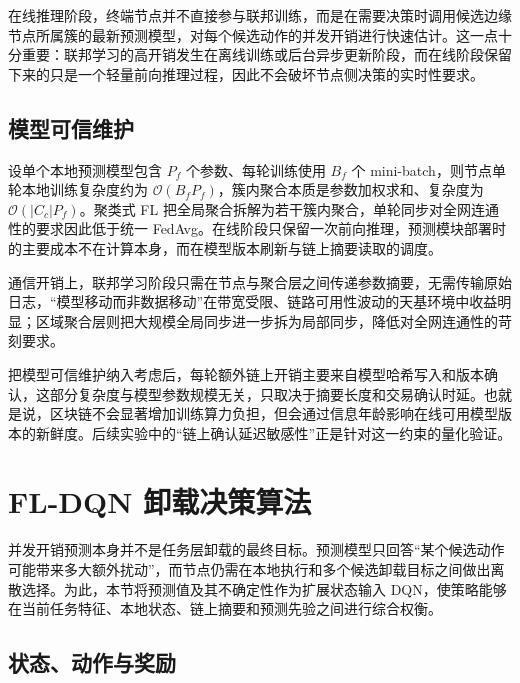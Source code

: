 在线推理阶段，终端节点并不直接参与联邦训练，而是在需要决策时调用候选边缘节点所属簇的最新预测模型，对每个候选动作的并发开销进行快速估计。这一点十分重要：联邦学习的高开销发生在离线训练或后台异步更新阶段，而在线阶段保留下来的只是一个轻量前向推理过程，因此不会破坏节点侧决策的实时性要求。

\subsection{模型可信维护}

设单个本地预测模型包含 $P_f$ 个参数、每轮训练使用 $B_f$ 个 mini-batch，则节点单轮本地训练复杂度约为 $\mathcal{O}(B_f P_f)$，簇内聚合本质是参数加权求和、复杂度为 $\mathcal{O}(|C_c|P_f)$。聚类式 FL 把全局聚合拆解为若干簇内聚合，单轮同步对全网连通性的要求因此低于统一 FedAvg。在线阶段只保留一次前向推理，预测模块部署时的主要成本不在计算本身，而在模型版本刷新与链上摘要读取的调度。

通信开销上，联邦学习阶段只需在节点与聚合层之间传递参数摘要，无需传输原始日志，“模型移动而非数据移动”在带宽受限、链路可用性波动的天基环境中收益明显；区域聚合层则把大规模全局同步进一步拆为局部同步，降低对全网连通性的苛刻要求。

把模型可信维护纳入考虑后，每轮额外链上开销主要来自模型哈希写入和版本确认，这部分复杂度与模型参数规模无关，只取决于摘要长度和交易确认时延。也就是说，区块链不会显著增加训练算力负担，但会通过信息年龄影响在线可用模型版本的新鲜度。后续实验中的“链上确认延迟敏感性”正是针对这一约束的量化验证。

\section{FL-DQN 卸载决策算法}
\label{sec:ch5_dqn_policy}
并发开销预测本身并不是任务层卸载的最终目标。预测模型只回答“某个候选动作可能带来多大额外扰动”，而节点仍需在本地执行和多个候选卸载目标之间做出离散选择。为此，本节将预测值及其不确定性作为扩展状态输入 DQN，使策略能够在当前任务特征、本地状态、链上摘要和预测先验之间进行综合权衡。

\subsection{状态、动作与奖励}

